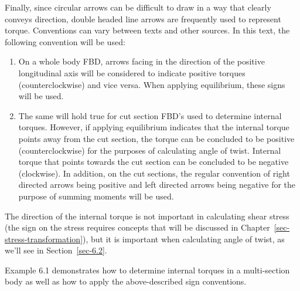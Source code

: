 \documentclass[
  letterpaper,
  DIV=11,
  numbers=noendperiod]{scrreprt}
\providecommand{\tightlist}{%
  \setlength{\itemsep}{0pt}\setlength{\parskip}{0pt}}\usepackage{longtable,booktabs,array}
\theoremstyle{definition}
\theoremstyle{remark}
\begin{document}
Finally, since circular arrows can be difficult to draw in a way that
clearly conveys direction, double headed line arrows are frequently used
to represent torque. Conventions can vary between texts and other
sources. In this text, the following convention will be used:

\begin{enumerate}
\def\labelenumi{\arabic{enumi}.}
\tightlist
\item
  On a whole body FBD, arrows facing in the direction of the positive
  longitudinal axis will be considered to indicate positive torques
  (counterclockwise) and vice versa. When applying equilibrium, these
  signs will be used.
\item
  The same will hold true for cut section FBD's used to determine
  internal torques. However, if applying equilibrium indicates that the
  internal torque points away from the cut section, the torque can be
  concluded to be positive (counterclockwise) for the purposes of
  calculating angle of twist. Internal torque that points towards the
  cut section can be concluded to be negative (clockwise). In addition,
  on the cut sections, the regular convention of right directed arrows
  being positive and left directed arrows being negative for the purpose
  of summing moments will be used.
\end{enumerate}

The direction of the internal torque is not important in calculating
shear stress (the sign on the stress requires concepts that will be
discussed in Chapter~\ref{sec-stress-transformation}), but it is
important when calculating angle of twist, as we'll see in
Section~\ref{sec-6.2}.

Example 6.1 demonstrates how to determine internal torques in a
multi-section body as well as how to apply the above-described sign
conventions.
\end{document}
